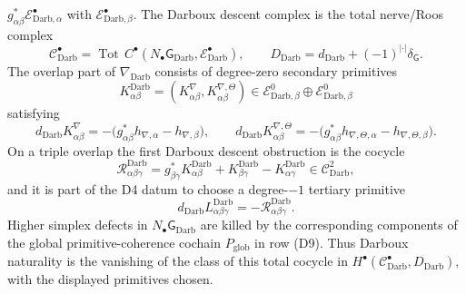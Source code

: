 \begin{defn}
\begin{enumerate}[label=\textup{(D\arabic*)}]
    \(g_{\alpha\beta}^*\mathcal E^\bullet_{\mathrm{Darb},\alpha}\) with
    \(\mathcal E^\bullet_{\mathrm{Darb},\beta}\).  The Darboux descent
    complex is the total nerve/Roos complex
    \[
      \mathcal C^\bullet_{\mathrm{Darb}}
      =
      \operatorname{Tot}\,
      C^\bullet\!\left(
      N_\bullet\mathsf G_{\mathrm{Darb}},
      \mathcal E^\bullet_{\mathrm{Darb}}\right),
      \qquad
      D_{\mathrm{Darb}}=d_{\mathrm{Darb}}
      +(-1)^{|\cdot|}\delta_{\mathsf G}.
    \]
    The overlap part of \(\nabla_{\mathrm{Darb}}\) consists of
    degree-zero secondary primitives
    \[
      K^{\mathrm{Darb}}_{\alpha\beta}
      =
      (K^\nabla_{\alpha\beta},K^{\nabla,\Theta}_{\alpha\beta})
      \in
      \mathcal E^0_{\mathrm{Darb},\beta}
      \oplus
      \mathcal E^0_{\mathrm{Darb},\beta}
    \]
    satisfying
    \[
      d_{\mathrm{Darb}}K^\nabla_{\alpha\beta}
      =
      -\bigl(g_{\alpha\beta}^*h_{\nabla,\alpha}
        -h_{\nabla,\beta}\bigr),
      \qquad
      d_{\mathrm{Darb}}K^{\nabla,\Theta}_{\alpha\beta}
      =
      -\bigl(g_{\alpha\beta}^*h_{\nabla,\Theta,\alpha}
        -h_{\nabla,\Theta,\beta}\bigr).
    \]
    On a triple overlap the first Darboux descent obstruction is the
    cocycle
    \[
      \mathcal R^{\mathrm{Darb}}_{\alpha\beta\gamma}
      =
      g_{\beta\gamma}^*K^{\mathrm{Darb}}_{\alpha\beta}
      +K^{\mathrm{Darb}}_{\beta\gamma}
      -K^{\mathrm{Darb}}_{\alpha\gamma}
      \in
      \mathcal C^2_{\mathrm{Darb}},
    \]
    and it is part of the D4 datum to choose a degree-\(-1\) tertiary
    primitive
    \[
      d_{\mathrm{Darb}}L^{\mathrm{Darb}}_{\alpha\beta\gamma}
      =
      -\mathcal R^{\mathrm{Darb}}_{\alpha\beta\gamma}.
    \]
    Higher simplex defects in
    \(N_\bullet\mathsf G_{\mathrm{Darb}}\) are killed by the
    corresponding components of the global primitive-coherence cochain
    \(P_{\mathrm{glob}}\) in row \textup{(D9)}.  Thus Darboux
    naturality is the vanishing of the class of this total cocycle in
    \(H^\bullet(\mathcal C^\bullet_{\mathrm{Darb}},D_{\mathrm{Darb}})\),
    with the displayed primitives chosen.


\end{enumerate}
\end{defn}
